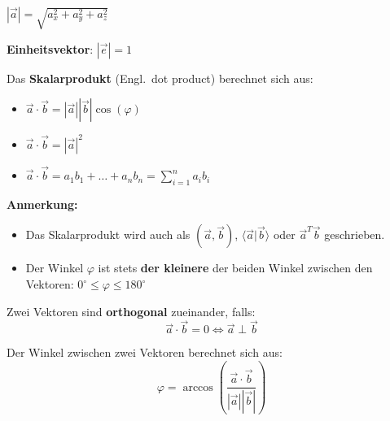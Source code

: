 
\vspace{0.5em}

\begin{multicols}{2}
    \begin{center}
        $|\vec{a}| = \sqrt{a_x^2 + a_y^2 + a_z^2}$
    \end{center}

    \textbf{Einheitsvektor}: $|\vec{e}| = 1$
\end{multicols}


Das \textbf{Skalarprodukt} (Engl.\ dot product) berechnet sich aus:
\begin{itemize}
    \item $\vec{a} \cdot \vec{b} = |\vec{a}| |\vec{b}| \cos(\varphi)$
    \item $\vec{a} \cdot \vec{b} = |\vec{a}|^2$
    \item $\vec{a} \cdot \vec{b} = a_1 b_1 + \dots + a_n b_n = \sum_{i=1}^{n} a_i b_i$
\end{itemize}

\textbf{Anmerkung:}
\begin{itemize}
    \item Das Skalarprodukt wird auch als $(\vec{a}, \vec{b})$, $\langle \vec{a} | \vec{b} \rangle$ oder $\vec{a}^T \vec{b}$ geschrieben.
    \item Der Winkel $\varphi$ ist stets \textbf{der kleinere} der beiden Winkel zwischen den Vektoren: $0^{\circ} \leq \varphi \leq 180^{\circ}$
\end{itemize}

Zwei Vektoren sind \textbf{orthogonal} zueinander, falls: \[\vec{a} \cdot \vec{b} = 0 \Leftrightarrow \vec{a} \perp \vec{b}\]

Der Winkel zwischen zwei Vektoren berechnet sich aus: \[\varphi = \arccos \left( \frac{\vec{a} \cdot \vec{b}}{|\vec{a}| |\vec{b}|} \right)\]


